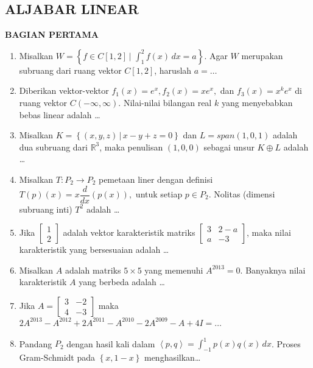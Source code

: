 \documentclass[12pt,twoside]{article}
\begin{document}
\subsection{ALJABAR LINEAR}
\textbf{BAGIAN PERTAMA}
\begin{enumerate}
	\item Misalkan $W = \left\lbrace f \in C [1,2]\, \bigg|\,\displaystyle \, \int_{1}^{2} f(x)\,dx = a \right\rbrace$. Agar $W$ merupakan subruang dari ruang vektor $C[1,2]$, haruslah $a = \dots$

	\item Diberikan vektor-vektor $f_1(x) = e^x, f_2(x) = xe^x,$ dan $f_3(x) = x^ke^x$ di ruang vektor $C(-\infty, \infty)$. Nilai-nilai bilangan real $k$ yang menyebabkan bebas linear adalah \dots

	\item Misalkan $K = \left\lbrace (x,y,z)\,|\, x-y+z = 0 \right\rbrace$ dan $L = span(1,0,1)$ adalah dua subruang dari $\mathbb{R}^3$, maka penulisan $(1,0,0)$ sebagai unsur $K \oplus L$ adalah \dots

	\item Misalkan $T : P_2 \to P_2$ pemetaan liner dengan definisi $T(p)(x)= x \dfrac{d}{dx} (p(x)),$ untuk setiap $p \in P_2$. Nolitas (dimensi subruang inti) $T^2$ adalah \dots

	\item Jika $\left[ \begin{array}{c}
				      1 \\2
			      \end{array} \right]$ adalah vektor karakteristik matriks $\left[ \begin{array}{cc}
				      3 & 2-a \\a&-3
			      \end{array} \right]$, maka nilai karakteristik yang bersesuaian adalah \dots

	\item Misalkan $A$ adalah matriks $5 \times 5$ yang memenuhi $A^{2013} = 0$. Banyaknya nilai karakteristik $A$ yang berbeda adalah \dots

	\item Jika $A = \left[ \begin{array}{cc}
				      3 & -2 \\4&-3
			      \end{array} \right]$ maka $2A^{2013}-A^{2012}+2A^{2011}-A^{2010}-2A^{2009}-A+4I = \dots$

	\item Pandang $P_2$ dengan hasil kali dalam $\left< p,q \right> =\displaystyle \int_{-1}^{1} p(x)q(x)\,dx$. Proses Gram-Schmidt pada $\left\lbrace x,1-x \right\rbrace$ menghasilkan\dots
\end{enumerate}
\end{document}
